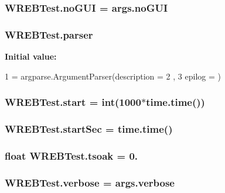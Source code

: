 \subsubsection[{\texorpdfstring{no\+G\+UI}{noGUI}}]{\setlength{\rightskip}{0pt plus 5cm}W\+R\+E\+B\+Test.\+no\+G\+UI = args.\+no\+G\+UI}\hypertarget{namespace_w_r_e_b_test_aed7bb7d828042f54ec6693855fd900ee}{}\label{namespace_w_r_e_b_test_aed7bb7d828042f54ec6693855fd900ee}
\subsubsection[{\texorpdfstring{parser}{parser}}]{\setlength{\rightskip}{0pt plus 5cm}W\+R\+E\+B\+Test.\+parser}\hypertarget{namespace_w_r_e_b_test_af72adb2f5e4faf500bb36f461f008af6}{}\label{namespace_w_r_e_b_test_af72adb2f5e4faf500bb36f461f008af6}
{\bfseries Initial value\+:}
\begin{DoxyCode}
1 = argparse.ArgumentParser(description =
2         ,
3                                      epilog = )
\end{DoxyCode}
\subsubsection[{\texorpdfstring{start}{start}}]{\setlength{\rightskip}{0pt plus 5cm}W\+R\+E\+B\+Test.\+start = int(1000$\ast$time.\+time())}\hypertarget{namespace_w_r_e_b_test_a10204c9815e05b0ec10333b96a9f23b1}{}\label{namespace_w_r_e_b_test_a10204c9815e05b0ec10333b96a9f23b1}
\subsubsection[{\texorpdfstring{start\+Sec}{startSec}}]{\setlength{\rightskip}{0pt plus 5cm}W\+R\+E\+B\+Test.\+start\+Sec = time.\+time()}\hypertarget{namespace_w_r_e_b_test_a82e575e7fa540ddb3d203d251cf9dd49}{}\label{namespace_w_r_e_b_test_a82e575e7fa540ddb3d203d251cf9dd49}
\subsubsection[{\texorpdfstring{tsoak}{tsoak}}]{\setlength{\rightskip}{0pt plus 5cm}float W\+R\+E\+B\+Test.\+tsoak = 0.}\hypertarget{namespace_w_r_e_b_test_acaeadc24f2eeacc666c9a23b4867302f}{}\label{namespace_w_r_e_b_test_acaeadc24f2eeacc666c9a23b4867302f}
\subsubsection[{\texorpdfstring{verbose}{verbose}}]{\setlength{\rightskip}{0pt plus 5cm}W\+R\+E\+B\+Test.\+verbose = args.\+verbose}\hypertarget{namespace_w_r_e_b_test_a2c7e905f2a556f0b4afa2261b75a8d58}{}\label{namespace_w_r_e_b_test_a2c7e905f2a556f0b4afa2261b75a8d58}
